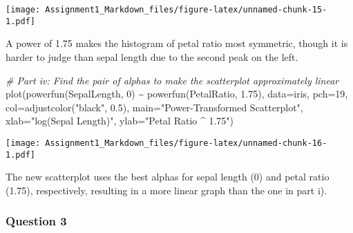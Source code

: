 \documentclass[
]{article}
\newenvironment{Shaded}{\begin{snugshade}}{\end{snugshade}}
\newcommand{\AttributeTok}[1]{\textcolor[rgb]{0.77,0.63,0.00}{#1}}
\newcommand{\CommentTok}[1]{\textcolor[rgb]{0.56,0.35,0.01}{\textit{#1}}}
\newcommand{\DecValTok}[1]{\textcolor[rgb]{0.00,0.00,0.81}{#1}}
\newcommand{\FloatTok}[1]{\textcolor[rgb]{0.00,0.00,0.81}{#1}}
\newcommand{\FunctionTok}[1]{\textcolor[rgb]{0.00,0.00,0.00}{#1}}
\newcommand{\NormalTok}[1]{#1}
\newcommand{\SpecialCharTok}[1]{\textcolor[rgb]{0.00,0.00,0.00}{#1}}
\newcommand{\StringTok}[1]{\textcolor[rgb]{0.31,0.60,0.02}{#1}}
\begin{document}
\begin{Shaded}
\end{Shaded}

\texttt{[image: Assignment1\_Markdown\_files/figure-latex/unnamed-chunk-15-1.pdf]}

A power of 1.75 makes the histogram of petal ratio most symmetric,
though it is harder to judge than sepal length due to the second peak on
the left.

\newpage

\begin{Shaded}
\begin{Highlighting}[]
\CommentTok{\# Part iv: Find the pair of alphas to make the scatterplot approximately linear}
\FunctionTok{plot}\NormalTok{(}\FunctionTok{powerfun}\NormalTok{(SepalLength, }\DecValTok{0}\NormalTok{) }\SpecialCharTok{\textasciitilde{}} \FunctionTok{powerfun}\NormalTok{(PetalRatio, }\FloatTok{1.75}\NormalTok{), }\AttributeTok{data=}\NormalTok{iris, }
     \AttributeTok{pch=}\DecValTok{19}\NormalTok{, }\AttributeTok{col=}\FunctionTok{adjustcolor}\NormalTok{(}\StringTok{"black"}\NormalTok{, }\FloatTok{0.5}\NormalTok{),}
     \AttributeTok{main=}\StringTok{"Power{-}Transformed Scatterplot"}\NormalTok{, }
     \AttributeTok{xlab=}\StringTok{"log(Sepal Length)"}\NormalTok{, }\AttributeTok{ylab=}\StringTok{"Petal Ratio \^{} 1.75"}\NormalTok{)}
\end{Highlighting}
\end{Shaded}

\texttt{[image: Assignment1\_Markdown\_files/figure-latex/unnamed-chunk-16-1.pdf]}

The new scatterplot uses the best alphas for sepal length (0) and petal
ratio (1.75), respectively, resulting in a more linear graph than the
one in part i).

\newpage

\hypertarget{question-3}{%
\subsubsection{Question 3}\label{question-3}}
\end{document}
